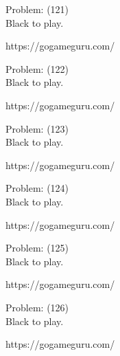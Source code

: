 \documentclass[11pt]{article}
\begin{document}
\begin{minipage}[t]{0.5\textwidth}
  {\centering
  
Problem: (121)\\
Black to play.

https://gogameguru.com/\\
  }
\end{minipage}
\begin{minipage}[t]{0.5\textwidth}
  {\centering
  
Problem: (122)\\
Black to play.

https://gogameguru.com/\\
  }
\end{minipage}
\begin{minipage}[t]{0.5\textwidth}
  {\centering
  
Problem: (123)\\
Black to play.

https://gogameguru.com/\\
  }
\end{minipage}
\begin{minipage}[t]{0.5\textwidth}
  {\centering
  
Problem: (124)\\
Black to play.

https://gogameguru.com/\\
  }
\end{minipage}
\begin{minipage}[t]{0.5\textwidth}
  {\centering
  
Problem: (125)\\
Black to play.

https://gogameguru.com/\\
  }
\end{minipage}
\begin{minipage}[t]{0.5\textwidth}
  {\centering
  
Problem: (126)\\
Black to play.

https://gogameguru.com/\\
  }
\end{minipage}
\end{document}
